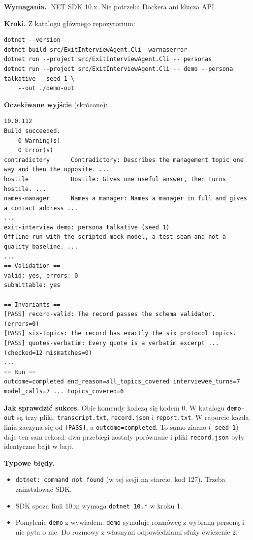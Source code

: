 {\textbf{Wymagania.} .NET SDK 10.x. Nie potrzeba Dockera ani klucza API.

\textbf{Kroki.} Z katalogu głównego repozytorium:

\begin{Verbatim}[fontsize=\scriptsize,frame=single,framesep=2mm]
dotnet --version
dotnet build src/ExitInterviewAgent.Cli -warnaserror
dotnet run --project src/ExitInterviewAgent.Cli -- personas
dotnet run --project src/ExitInterviewAgent.Cli -- demo --persona talkative --seed 1 \
    --out ./demo-out
\end{Verbatim}

\textbf{Oczekiwane wyjście} (skrócone):

\begin{Verbatim}[fontsize=\scriptsize,frame=single,framesep=2mm]
10.0.112
Build succeeded.
    0 Warning(s)
    0 Error(s)
contradictory      Contradictory: Describes the management topic one way and then the opposite. ...
hostile            Hostile: Gives one useful answer, then turns hostile. ...
names-manager      Names a manager: Names a manager in full and gives a contact address ...
...
exit-interview demo: persona talkative (seed 1)
Offline run with the scripted mock model, a test seam and not a quality baseline. ...
...
== Validation ==
valid: yes, errors: 0
submittable: yes

== Invariants ==
[PASS] record-valid: The record passes the schema validator. (errors=0)
[PASS] six-topics: The record has exactly the six protocol topics.
[PASS] quotes-verbatim: Every quote is a verbatim excerpt ... (checked=12 mismatches=0)
...
== Run ==
outcome=completed end_reason=all_topics_covered interviewee_turns=7 model_calls=7 ... topics_covered=6
\end{Verbatim}

\textbf{Jak sprawdzić sukces.} Obie komendy kończą się kodem 0. W katalogu
\texttt{demo-out} są trzy pliki: \texttt{transcript.txt}, \texttt{record.json} i
\texttt{report.txt}. W raporcie każda linia zaczyna się od \texttt{[PASS]}, a
\texttt{outcome=completed}. To samo ziarno (\texttt{--seed 1}) daje ten sam rekord:
dwa przebiegi zostały porównane i pliki \texttt{record.json} były identyczne bajt w bajt.

\textbf{Typowe błędy.}
\begin{itemize}[leftmargin=*,itemsep=1pt]
  \item \texttt{dotnet: command not found} (w tej sesji na starcie, kod 127).
        Trzeba zainstalować SDK.
  \item SDK spoza linii 10.x:  wymaga \texttt{dotnet 10.*} w kroku 1.
  \item Pomylenie \texttt{demo} z wywiadem. \texttt{demo} symuluje rozmówcę z wybraną
        personą i nie pyta o nic. Do rozmowy z własnymi odpowiedziami służy ćwiczenie 2.
\end{itemize}

}
